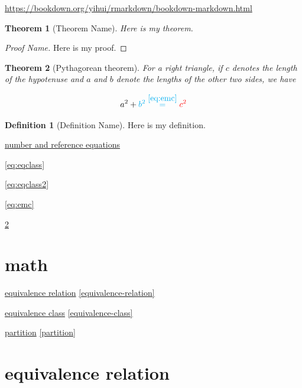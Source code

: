 \documentclass[
]{book}
\newtheorem{theorem}{Theorem}[chapter]
\theoremstyle{definition}
\newtheorem{definition}{Definition}[chapter]
\theoremstyle{definition}
\theoremstyle{definition}
\theoremstyle{definition}
\theoremstyle{remark}
\begin{document}
\url{https://bookdown.org/yihui/rmarkdown/bookdown-markdown.html}

\begin{theorem}[Theorem Name]
\protect\hypertarget{thm:label}{}\label{thm:label}Here is my theorem.
\end{theorem}

\begin{proof}[Proof Name]
Here is my proof.
\end{proof}

\begin{theorem}[Pythagorean theorem]
\protect\hypertarget{thm:pyth}{}\label{thm:pyth}For a right triangle, if \(c\) denotes the length of the hypotenuse
and \(a\) and \(b\) denote the lengths of the other two sides, we have

\[a^2 + \color{cyan}b^2 \overset{\ref{eq:emc}}= \color{red}{c^2} \]
\end{theorem}

\begin{definition}[Definition Name]
\protect\hypertarget{def:unnamed-chunk-2}{}\label{def:unnamed-chunk-2}Here is my definition.
\end{definition}

\protect\hyperlink{number-and-reference-equations}{number and reference equations}

\eqref{eq:eqclass}

\eqref{eq:eqclass2}

\eqref{eq:emc}

\ref{thm:pyth}

\hypertarget{nice-label}{%
\chapter{math}\label{nice-label}}

\protect\hyperlink{equivalence-relation}{equivalence relation} \ref{equivalence-relation}

\protect\hyperlink{equivalence-class}{equivalence class} \ref{equivalence-class}

\protect\hyperlink{partition}{partition} \ref{partition}

\hypertarget{equivalence-relation}{%
\chapter*{equivalence relation}\label{equivalence-relation}}
\end{document}
